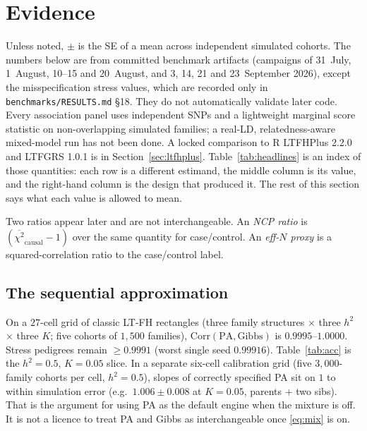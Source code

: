 \documentclass[11pt,a4paper]{article}
\newcommand{\Corr}{\mathrm{Corr}}
\newcommand{\h}{h^{2}}
\begin{document}
\section{Evidence}
\label{sec:results}

Unless noted, $\pm$ is the SE of a mean across independent simulated
cohorts.
The numbers below are from committed benchmark artifacts
(campaigns of 31~July, 1~August, 10--15 and 20~August, and 3, 14, 21
and 23~September 2026), except the misspecification stress values,
which are recorded only in \texttt{benchmarks/RESULTS.md} \S18.
They do not automatically validate later code.
Every association panel uses independent SNPs and a lightweight marginal score
statistic on non-overlapping simulated families; a real-LD,
relatedness-aware mixed-model run has not been done.
A locked comparison to R LTFHPlus 2.2.0 and LTFGRS 1.0.1 is in
Section~\ref{sec:ltfhplus}.
Table~\ref{tab:headlines} is an index of those quantities: each row
is a different estimand, the middle column is its value, and the
right-hand column is the design that produced it.
The rest of this section says what each value is allowed to mean.

Two ratios appear later and are not interchangeable.
An \emph{NCP ratio} is
$(\overline{\chi^{2}}_{\mathrm{causal}}-1)$ over the same quantity
for case/control.
An \emph{eff-$N$ proxy} is a squared-correlation ratio to the
case/control label.

\begin{table}[ht]
\centering
\caption{Headline quantities from the committed simulation artifacts.
Each row is a different quantity.
Value is that quantity: a range, a mean $\pm$ replicate SE, or
(the NCP-increment row only) a paired $95\%$ CI half-width.
Setting is the design.
Independent SNPs throughout; no row uses the censoring mixture
\eqref{eq:mix}.}
\label{tab:headlines}
\small

\end{table}

\subsection{The sequential approximation}

On a $27$-cell grid of classic LT-FH rectangles
(three family structures $\times$ three $\h$ $\times$ three $K$;
five cohorts of $1{,}500$ families),
$\Corr(\mathrm{PA},\mathrm{Gibbs})$ is $0.9995$--$1.0000$.
Stress pedigrees remain $\ge 0.9991$ (worst single seed $0.99916$).
Table~\ref{tab:acc} is the $\h=0.5$, $K=0.05$ slice.
In a separate six-cell calibration grid (five $3{,}000$-family cohorts per
cell, $\h=0.5$), slopes of correctly specified PA sit on $1$ to within
simulation error (e.g.\ $1.006\pm 0.008$ at $K=0.05$, parents + two
sibs).
That is the argument for using PA as the default engine when the
mixture is off.
It is not a licence to treat PA and Gibbs as interchangeable once
\eqref{eq:mix} is on.
\end{document}
